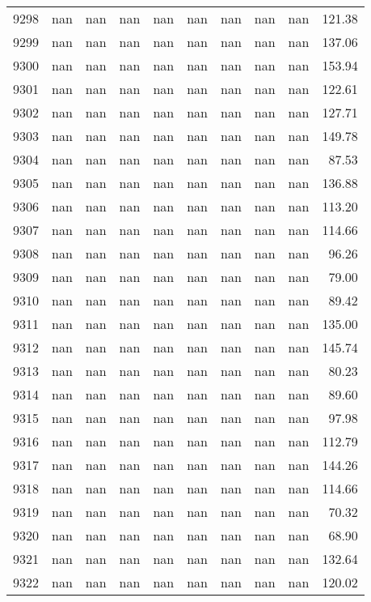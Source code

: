 \begin{tabular}{lrrrrrrrrr}
9298 & nan & nan & nan & nan & nan & nan & nan & nan & 121.38 \\
9299 & nan & nan & nan & nan & nan & nan & nan & nan & 137.06 \\
9300 & nan & nan & nan & nan & nan & nan & nan & nan & 153.94 \\
9301 & nan & nan & nan & nan & nan & nan & nan & nan & 122.61 \\
9302 & nan & nan & nan & nan & nan & nan & nan & nan & 127.71 \\
9303 & nan & nan & nan & nan & nan & nan & nan & nan & 149.78 \\
9304 & nan & nan & nan & nan & nan & nan & nan & nan & 87.53 \\
9305 & nan & nan & nan & nan & nan & nan & nan & nan & 136.88 \\
9306 & nan & nan & nan & nan & nan & nan & nan & nan & 113.20 \\
9307 & nan & nan & nan & nan & nan & nan & nan & nan & 114.66 \\
9308 & nan & nan & nan & nan & nan & nan & nan & nan & 96.26 \\
9309 & nan & nan & nan & nan & nan & nan & nan & nan & 79.00 \\
9310 & nan & nan & nan & nan & nan & nan & nan & nan & 89.42 \\
9311 & nan & nan & nan & nan & nan & nan & nan & nan & 135.00 \\
9312 & nan & nan & nan & nan & nan & nan & nan & nan & 145.74 \\
9313 & nan & nan & nan & nan & nan & nan & nan & nan & 80.23 \\
9314 & nan & nan & nan & nan & nan & nan & nan & nan & 89.60 \\
9315 & nan & nan & nan & nan & nan & nan & nan & nan & 97.98 \\
9316 & nan & nan & nan & nan & nan & nan & nan & nan & 112.79 \\
9317 & nan & nan & nan & nan & nan & nan & nan & nan & 144.26 \\
9318 & nan & nan & nan & nan & nan & nan & nan & nan & 114.66 \\
9319 & nan & nan & nan & nan & nan & nan & nan & nan & 70.32 \\
9320 & nan & nan & nan & nan & nan & nan & nan & nan & 68.90 \\
9321 & nan & nan & nan & nan & nan & nan & nan & nan & 132.64 \\
9322 & nan & nan & nan & nan & nan & nan & nan & nan & 120.02 \\

\end{tabular}
